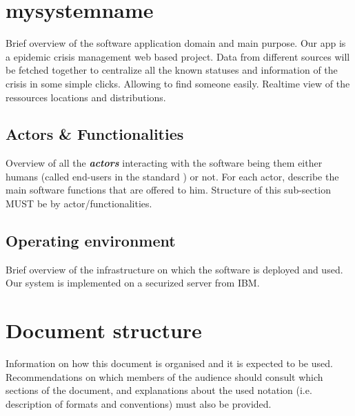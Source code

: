 \section{mysystemname}
Brief overview of the software application domain and main purpose.
Our app is a epidemic crisis management web based project. Data from different
sources will be fetched together to centralize all the known statuses and
information of the crisis in some simple clicks. Allowing to find someone
easily. Realtime view of the ressources locations and distributions.

\subsection{Actors \& Functionalities}
Overview of all the \textbf{\emph{\glspl{actor}}} interacting with the software
being them either humans (called end-users in the standard
\cite{IEEE-2001-userdocumentation}) or not. For each actor, describe the main
software functions that are offered to him. Structure of this sub-section MUST
be by actor/functionalities.


\subsection{Operating environment}
Brief overview of the infrastructure on which the software is deployed and used.
Our system is implemented on a securized server from IBM.

\section{Document structure}  
Information on how this document is organised and it is expected to be
used. Recommendations on which members of the audience
should consult which sections of the document, and explanations about the used
notation (i.e. description of formats and conventions) must also be provided.







